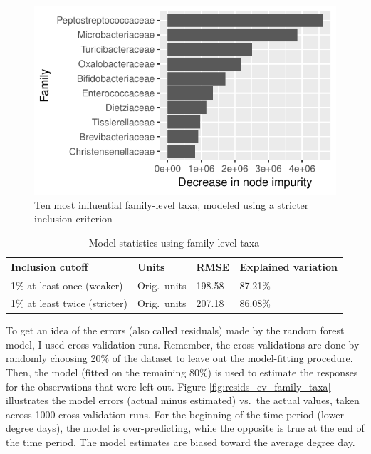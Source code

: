 \documentclass{article}
\begin{document}
\begin{figure}
  \centering
  \includegraphics{../../only_families/all_time_steps/hit_1perc_twice/orig_units_all_data_families_barchart}
  \caption{Ten most influential family-level taxa, modeled using a stricter inclusion criterion}
  \label{fig:infl_family_taxa_stric_crit}
\end{figure}


\begin{table}
  \centering
\caption{\label{tbl:family_all_data_model_stats}Model statistics using family-level taxa}
\begin{tabular}{llll}
Inclusion cutoff & Units  & RMSE & Explained variation\\ \hline
1\% at least once (weaker)  & Orig.~units & 198.58 & 87.21\%\\
1\% at least twice (stricter) & Orig.~units & 207.18 & 86.08\% %
\end{tabular}
\end{table}

To get an idea of the errors (also called residuals) made by the
random forest model, I used cross-validation runs.  Remember, the
cross-validations are done by randomly choosing 20\% of the dataset to
leave out the model-fitting procedure.  Then, the model (fitted on the
remaining 80\%) is used to estimate the responses for the observations
that were left out.  Figure \ref{fig:resids_cv_family_taxa}
illustrates the model errors (actual minus estimated) vs.~the actual
values, taken across 1000 cross-validation runs.  For the beginning of
the time period (lower degree days), the model is over-predicting,
while the opposite is true at the end of the time period.  The model
estimates are biased toward the average degree day.
\end{document}

